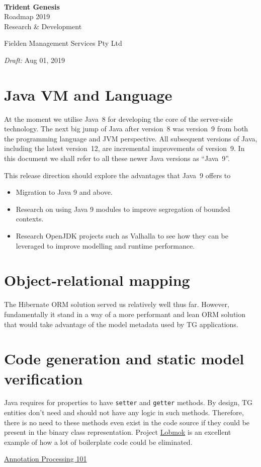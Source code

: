 \documentclass[a4paper,12pt,oneside,openright]{memoir}
\newcommand*{\titleTH}{\begingroup%
\raggedleft
\vspace*{\baselineskip}
{\Large ~}\\[0.167\textheight]
{\bfseries Trident Genesis}\\[\baselineskip]
{\textcolor{basiccolor}{\Huge Roadmap 2019}}\\[\baselineskip]
{\small Research \& Development}\par
\vfill
{\Large Fielden Management Services Pty Ltd}\par
\vspace*{1\baselineskip}
{\emph{Draft:} Aug 01, 2019}\par
\endgroup}
\begin{document}
\pagestyle{fmsstyle}

\titleTH
\thispagestyle{empty}

\frontmatter
\doublespacing


\begin{spacing}{1}
\tableofcontents
\end{spacing}

\mainmatter
\chapter{Java VM and Language}
At the moment we utilise Java~8 for developing the core of the server-side technology.
The next big jump of Java after version~8 was version~9 from both the programming language and JVM perspective.
All subsequent versions of Java, including the latest version~12, are incremental improvements of version~9.
In this document we shall refer to all these newer Java versions as ``Java~9''.

This release direction should explore the advantages that Java~9 offers to 
\begin{itemize}
  \item Migration to  Java 9 and above.
  \item Research on using Java 9 modules to improve segregation of bounded contexts.
  \item Research OpenJDK projects such as Valhalla to see how they can be leveraged to improve modelling and runtime performance.
\end{itemize}

\chapter{Object-relational mapping}

The Hibernate ORM solution served us relatively well thus far.
However, fundamentally it stand in a way of a more performant and lean ORM solution that would take advantage of the model metadata used by TG applications.

\chapter{Code generation and static model verification}

Java requires for properties to have \texttt{setter} and \texttt{getter} methods.
By design, TG entities don't need and should not have any logic in such methods.
Therefore, there is no need to these methods even exist in the code source if they could be present in the binary class representation. 
Project \href{https://projectlombok.org/}{Lobmok} is an excellent example of how a lot of boilerplate code could be eliminated.

\href{http://hannesdorfmann.com/annotation-processing/annotationprocessing101}{Annotation Processing 101}
\end{document}
